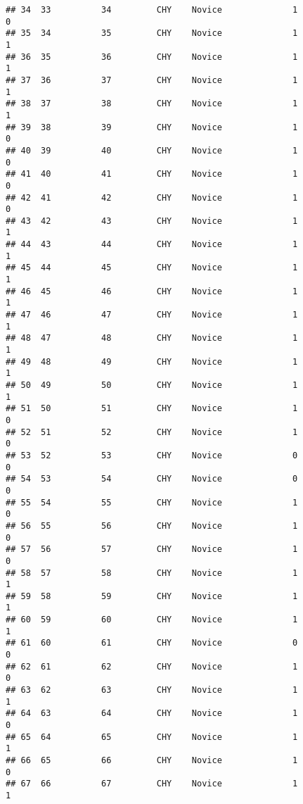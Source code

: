 \documentclass[
]{article}
\begin{document}
\begin{verbatim}
## 34  33          34         CHY    Novice              1                 0
## 35  34          35         CHY    Novice              1                 1
## 36  35          36         CHY    Novice              1                 1
## 37  36          37         CHY    Novice              1                 1
## 38  37          38         CHY    Novice              1                 1
## 39  38          39         CHY    Novice              1                 0
## 40  39          40         CHY    Novice              1                 0
## 41  40          41         CHY    Novice              1                 0
## 42  41          42         CHY    Novice              1                 0
## 43  42          43         CHY    Novice              1                 1
## 44  43          44         CHY    Novice              1                 1
## 45  44          45         CHY    Novice              1                 1
## 46  45          46         CHY    Novice              1                 1
## 47  46          47         CHY    Novice              1                 1
## 48  47          48         CHY    Novice              1                 1
## 49  48          49         CHY    Novice              1                 1
## 50  49          50         CHY    Novice              1                 1
## 51  50          51         CHY    Novice              1                 0
## 52  51          52         CHY    Novice              1                 0
## 53  52          53         CHY    Novice              0                 0
## 54  53          54         CHY    Novice              0                 0
## 55  54          55         CHY    Novice              1                 0
## 56  55          56         CHY    Novice              1                 0
## 57  56          57         CHY    Novice              1                 0
## 58  57          58         CHY    Novice              1                 1
## 59  58          59         CHY    Novice              1                 1
## 60  59          60         CHY    Novice              1                 1
## 61  60          61         CHY    Novice              0                 0
## 62  61          62         CHY    Novice              1                 0
## 63  62          63         CHY    Novice              1                 1
## 64  63          64         CHY    Novice              1                 0
## 65  64          65         CHY    Novice              1                 1
## 66  65          66         CHY    Novice              1                 0
## 67  66          67         CHY    Novice              1                 1

\end{verbatim}
\end{document}
